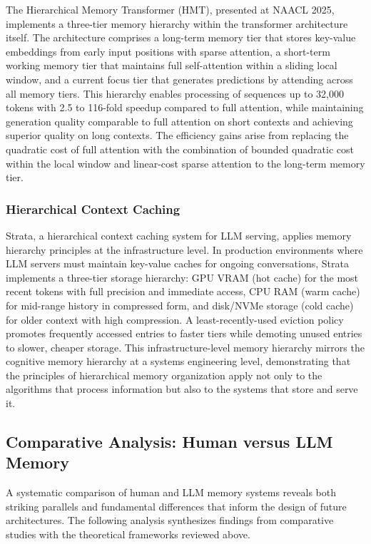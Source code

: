 \documentclass[11pt,letterpaper]{article}
\begin{document}
The Hierarchical Memory Transformer (HMT), presented at NAACL 2025, implements a three-tier memory hierarchy within the transformer architecture itself. The architecture comprises a long-term memory tier that stores key-value embeddings from early input positions with sparse attention, a short-term working memory tier that maintains full self-attention within a sliding local window, and a current focus tier that generates predictions by attending across all memory tiers. This hierarchy enables processing of sequences up to 32,000 tokens with 2.5 to 116-fold speedup compared to full attention, while maintaining generation quality comparable to full attention on short contexts and achieving superior quality on long contexts. The efficiency gains arise from replacing the quadratic cost of full attention with the combination of bounded quadratic cost within the local window and linear-cost sparse attention to the long-term memory tier.

\subsubsection{Hierarchical Context Caching}

Strata, a hierarchical context caching system for LLM serving, applies memory hierarchy principles at the infrastructure level. In production environments where LLM servers must maintain key-value caches for ongoing conversations, Strata implements a three-tier storage hierarchy: GPU VRAM (hot cache) for the most recent tokens with full precision and immediate access, CPU RAM (warm cache) for mid-range history in compressed form, and disk/NVMe storage (cold cache) for older context with high compression. A least-recently-used eviction policy promotes frequently accessed entries to faster tiers while demoting unused entries to slower, cheaper storage. This infrastructure-level memory hierarchy mirrors the cognitive memory hierarchy at a systems engineering level, demonstrating that the principles of hierarchical memory organization apply not only to the algorithms that process information but also to the systems that store and serve it.

\subsection{Comparative Analysis: Human versus LLM Memory}

A systematic comparison of human and LLM memory systems reveals both striking parallels and fundamental differences that inform the design of future architectures. The following analysis synthesizes findings from comparative studies \cite{cowan2024judgments, arrieta2024llm_cognitive} with the theoretical frameworks reviewed above.
\end{document}
